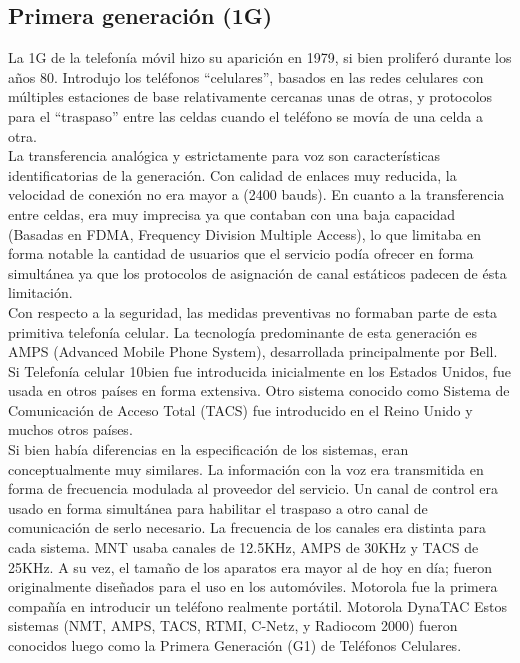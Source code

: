 \documentclass[]{article}
\begin{document}
\subsection{Primera generación (1G)}

La 1G de la telefonía móvil hizo su aparición en 1979, si bien proliferó durante los
años 80. Introdujo los teléfonos “celulares”, basados en las redes celulares con
múltiples estaciones de base relativamente cercanas unas de otras, y protocolos
para el “traspaso” entre las celdas cuando el teléfono se movía de una celda a otra.\\

La transferencia analógica y estrictamente para voz son características
identificatorias de la generación. Con calidad de enlaces muy reducida, la
velocidad de conexión no era mayor a (2400 bauds). En cuanto a la transferencia
entre celdas, era muy imprecisa ya que contaban con una baja capacidad (Basadas
en FDMA, Frequency Division Multiple Access), lo que limitaba en forma notable
la cantidad de usuarios que el servicio podía ofrecer en forma simultánea ya que
los protocolos de asignación de canal estáticos padecen de ésta limitación.\\

Con respecto a la seguridad, las medidas preventivas no formaban parte de esta
primitiva telefonía celular. La tecnología predominante de esta generación es
AMPS (Advanced Mobile Phone System), desarrollada principalmente por Bell. Si
Telefonía celular
10bien fue introducida inicialmente en los Estados Unidos, fue usada en otros países
en forma extensiva. Otro sistema conocido como Sistema de Comunicación de
Acceso Total (TACS) fue introducido en el Reino Unido y muchos otros países.\\

Si bien había diferencias en la especificación de los sistemas, eran conceptualmente
muy similares. La información con la voz era transmitida en forma de frecuencia
modulada al proveedor del servicio. Un canal de control era usado en forma
simultánea para habilitar el traspaso a otro canal de comunicación de serlo
necesario. La frecuencia de los canales era distinta para cada sistema. MNT usaba
canales de 12.5KHz, AMPS de 30KHz y TACS de 25KHz.
A su vez, el tamaño de los aparatos era mayor al de hoy en día; fueron
originalmente diseñados para el uso en los automóviles. Motorola fue la primera
compañía en introducir un teléfono realmente portátil.
Motorola DynaTAC
Estos sistemas (NMT, AMPS, TACS, RTMI, C-Netz, y Radiocom 2000) fueron
conocidos luego como la Primera Generación (G1) de Teléfonos Celulares.\\
\end{document}
